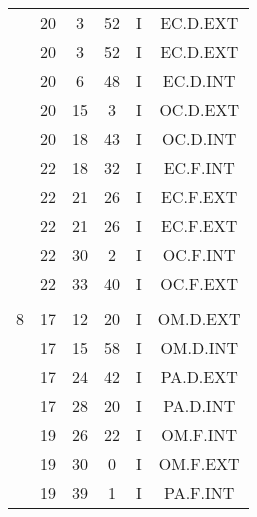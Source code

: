 \documentclass[12pt, a4paper]{article}
\begin{document}
\begin{multicols}{3}
{\begin{tabular}{c c c c c c}
	 	 	 	 & 20 & 3 & 52 & I & EC.D.EXT\\%
	 	 	 	 & 20 & 3 & 52 & I & EC.D.EXT\\%
	 	 	 	 & 20 & 6 & 48 & I & EC.D.INT\\%
	 	 	 	 & 20 & 15 & 3 & I & OC.D.EXT\\%
	 	 	 	 & 20 & 18 & 43 & I & OC.D.INT\\%
	 	 	 	 & 22 & 18 & 32 & I & EC.F.INT\\%
	 	 	 	 & 22 & 21 & 26 & I & EC.F.EXT\\%
	 	 	 	 & 22 & 21 & 26 & I & EC.F.EXT\\%
	 	 	 	 & 22 & 30 & 2 & I & OC.F.INT\\%
	 	 	 	 & 22 & 33 & 40 & I & OC.F.EXT\\%
	 	 	 	 & & & & & \\%
	 	 	 	8 & 17 & 12 & 20 & I & OM.D.EXT\\%
	 	 	 	 & 17 & 15 & 58 & I & OM.D.INT\\%
	 	 	 	 & 17 & 24 & 42 & I & PA.D.EXT\\%
	 	 	 	 & 17 & 28 & 20 & I & PA.D.INT\\%
	 	 	 	 & 19 & 26 & 22 & I & OM.F.INT\\%
	 	 	 	 & 19 & 30 & 0 & I & OM.F.EXT\\%
	 	 	 	 & 19 & 39 & 1 & I & PA.F.INT\\%
	 	 \end{tabular}
 	}
\end{multicols}
\end{document}
